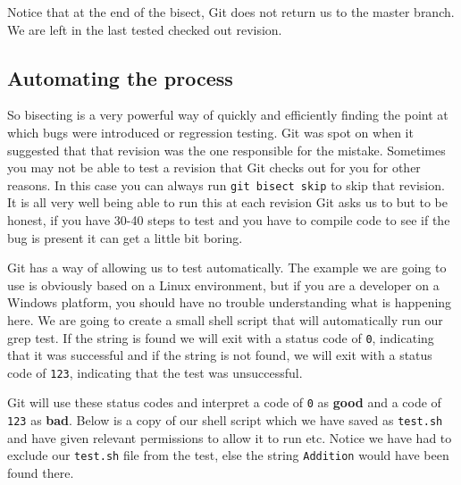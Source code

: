 
Notice that at the end of the bisect, Git does not return us to the master branch.
We are left in the last tested checked out revision.


\subsection{Automating the process}
So bisecting is a very powerful way of quickly and efficiently finding the point at which bugs were introduced or regression testing.
Git was spot on when it suggested that that revision was the one responsible for the mistake.
Sometimes you may not be able to test a revision that Git checks out for you for other reasons.
In this case you can always run \texttt{git bisect skip} to skip that revision.
It is all very well being able to run this at each revision Git asks us to but to be honest, if you have 30-40 steps to test and you have to compile code to see if the bug is present it can get a little bit boring.

Git has a way of allowing us to test automatically.
The example we are going to use is obviously based on a Linux environment, but if you are a developer on a Windows platform, you should have no trouble understanding what is happening here.
We are going to create a small shell script that will automatically run our grep test.
If the string is found we will exit with a status code of \texttt{0}, indicating that it was successful and if
the string is not found, we will exit with a status code of \texttt{123}, indicating that the test was unsuccessful.

Git will use these status codes and interpret a code of \texttt{0} as \textbf{good} and a code of \texttt{123} as \textbf{bad}.
Below is a copy of our shell script which we have saved as \texttt{test.sh} and have given relevant permissions to allow it to run etc.
Notice we have had to exclude our \texttt{test.sh} file from the test, else the string \texttt{Addition} would have been found there.

